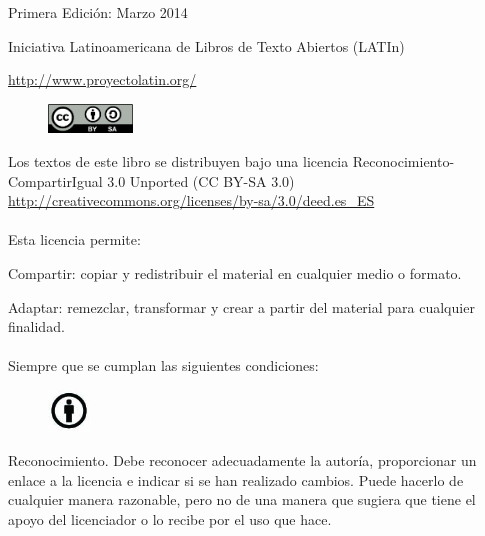 
{\parindent0pt

\vspace{2em}

Primera Edici\'on: Marzo 2014

Iniciativa Latinoamericana de Libros de Texto Abiertos (LATIn)

\url{http://www.proyectolatin.org/}

\begin{figure}[h!]
    \includegraphics[width=0.2\textwidth]{Pictures/creativecommons.png}
\end{figure}

Los textos de este libro se distribuyen bajo una licencia Reconocimiento-CompartirIgual 3.0 Unported (CC BY-SA 3.0) \url{http://creativecommons.org/licenses/by-sa/3.0/deed.es_ES}
\\
\\Esta licencia permite:

Compartir: copiar y redistribuir el material en cualquier medio o formato.

Adaptar: remezclar, transformar y crear a partir del material para cualquier finalidad.
\\
\\Siempre que se cumplan las siguientes condiciones:\\

\begin{figure}
\vspace{-20pt}
  \begin{center}
    \includegraphics[width=0.1\textwidth]{Pictures/by.jpg}
  \end{center}
\end{figure}
Reconocimiento. Debe reconocer adecuadamente la autor\'ia, proporcionar un enlace a la licencia e indicar si se han realizado cambios. Puede hacerlo de cualquier manera razonable, pero no de una manera que sugiera que tiene el apoyo del licenciador o lo recibe por el uso que hace.\\
\\

}
